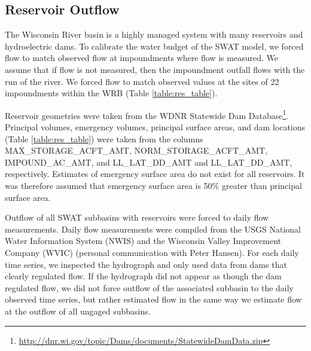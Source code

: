 \subsection{Reservoir Outflow}\label{sec:reservoirs}

The Wisconsin River basin is a highly managed system with many reservoirs and hydroelectric dams.
To calibrate the water budget of the SWAT model, we forced flow to match observed flow at impoundments where flow is measured. 
We assume that if flow is not measured, then the impoundment outfall flows with the run of the river. 
We forced flow to match observed values at the sites of 22 impoundments within the WRB (Table \ref{table:res_table}).

Reservoir geometries were taken from the WDNR Statewide Dam Database\footnote{\url{http://dnr.wi.gov/topic/Dams/documents/StatewideDamData.zip}}. 
Principal volumes, emergency volumes, principal surface areas, and dam locations (Table \ref{table:res_table}) were taken from the columns MAX\_STORAGE\_ACFT\_AMT, NORM\_STORAGE\_ACFT\_AMT, IMPOUND\_AC\_AMT, and LL\_LAT\_DD\_AMT and LL\_LAT\_DD\_AMT, respectively. 
Estimates of emergency surface area do not exist for all reservoirs. It was therefore assumed that emergency surface area is 50\% greater than principal surface area.

Outflow of all SWAT subbasins with reservoirs were forced to daily flow measurements. 
Daily flow measurements were compiled from the USGS National Water Information System (NWIS)  and the Wisconsin Valley Improvement Company (WVIC) (personal communication with Peter Hansen). For each daily time series, we inspected the hydrograph and only used data from dams that clearly regulated flow. 
If the hydrograph did not appear as though the dam regulated flow, we did not force outflow of the associated subbasin to the daily observed time series, but rather estimated flow in the same way we estimate flow at the outflow of all ungaged subbasins. 

